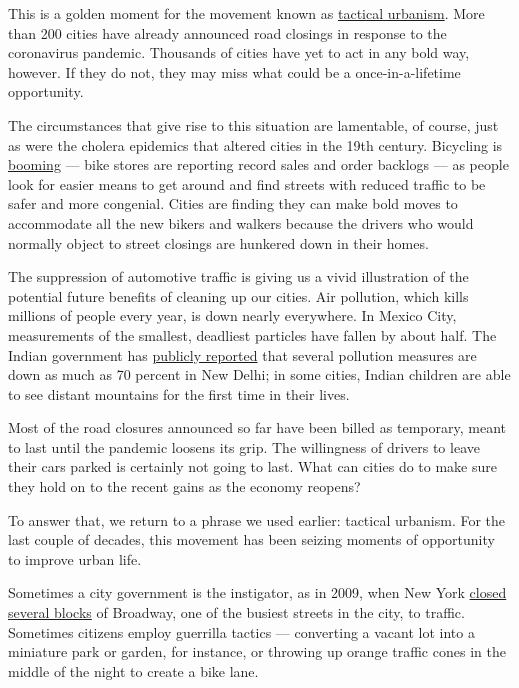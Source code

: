 This is a golden moment for the movement known as
\href{http://tacticalurbanismguide.com/about/}{tactical urbanism}. More
than 200 cities have already announced road closings in response to the
coronavirus pandemic. Thousands of cities have yet to act in any bold
way, however. If they do not, they may miss what could be a
once-in-a-lifetime opportunity.

The circumstances that give rise to this situation are lamentable, of
course, just as were the cholera epidemics that altered cities in the
19th century. Bicycling is
\href{https://www.nytimes3xbfgragh.onion/2020/05/18/nyregion/bike-shortage-coronavirus.html}{booming}
--- bike stores are reporting record sales and order backlogs --- as
people look for easier means to get around and find streets with reduced
traffic to be safer and more congenial. Cities are finding they can make
bold moves to accommodate all the new bikers and walkers because the
drivers who would normally object to street closings are hunkered down
in their homes.

The suppression of automotive traffic is giving us a vivid illustration
of the potential future benefits of cleaning up our cities. Air
pollution, which kills millions of people every year, is down nearly
everywhere. In Mexico City, measurements of the smallest, deadliest
particles have fallen by about half. The Indian government has
\href{https://www.news18.com/news/india/locked-under-blue-skies-air-quality-and-the-pandemic-2612719.html}{publicly
reported} that several pollution measures are down as much as 70 percent
in New Delhi; in some cities, Indian children are able to see distant
mountains for the first time in their lives.

Most of the road closures announced so far have been billed as
temporary, meant to last until the pandemic loosens its grip. The
willingness of drivers to leave their cars parked is certainly not going
to last. What can cities do to make sure they hold on to the recent
gains as the economy reopens?

To answer that, we return to a phrase we used earlier: tactical
urbanism. For the last couple of decades, this movement has been seizing
moments of opportunity to improve urban life.

Sometimes a city government is the instigator, as in 2009, when New York
\href{https://www.nytimes3xbfgragh.onion/2009/05/25/nyregion/25bway.html}{closed
several blocks} of Broadway, one of the busiest streets in the city, to
traffic. Sometimes citizens employ guerrilla tactics --- converting a
vacant lot into a miniature park or garden, for instance, or throwing up
orange traffic cones in the middle of the night to create a bike lane.

